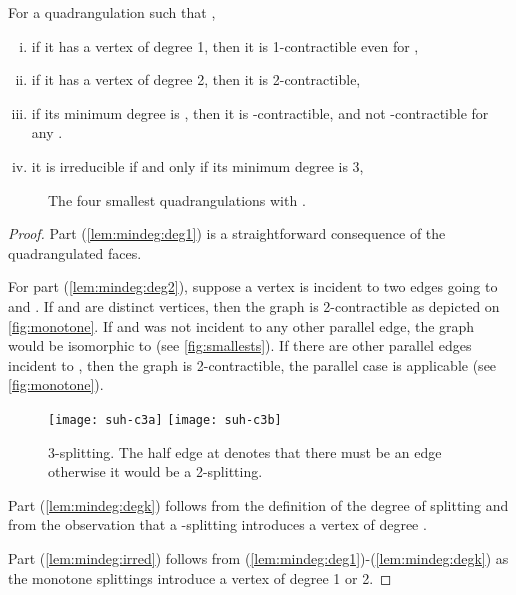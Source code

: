 \documentclass[]{article}
\begin{document}
\begin{prop}
\label{lem:mindeg}
For a quadrangulation such that ,
\begin{enumerate}[(i)]
\item 
  \label{lem:mindeg:deg1}
  if it has a vertex of degree 1, then it is 1-contractible even for ,
\item
  \label{lem:mindeg:deg2}
  if it has a vertex of degree 2, then it is 2-contractible,
\item
\label{lem:mindeg:degk}
  if its minimum degree is , then it is -contractible, and not -contractible for any .
\item
\label{lem:mindeg:irred}
  it is irreducible if and only if its minimum degree is 3,
\end{enumerate}
\end{prop}
\begin{figure}\centering
{}
\qquad
{}
\qquad
{}
\qquad
{}
\caption{The four smallest quadrangulations with .}
\label{fig:smallests}
\end{figure}
\begin{proof}
 Part (\ref*{lem:mindeg:deg1}) is a straightforward consequence of the quadrangulated faces.

For part (\ref*{lem:mindeg:deg2}), suppose a vertex  is incident to two edges going to  and .
If  and  are distinct vertices, then the graph is 2-contractible as depicted on \autoref{fig:monotone}.
If  and  was not incident to any other parallel edge, the graph would be isomorphic to  (see \autoref{fig:smallests}).
If there are other parallel edges incident to , then the graph is 2-contractible, the parallel case is applicable (see \autoref{fig:monotone}).

\begin{figure}\centering
  \texttt{[image: suh-c3a]}
\qquad
  \texttt{[image: suh-c3b]}
  \caption{3-splitting. The half edge at  denotes that there must be an edge otherwise it would be a 2-splitting.}
  \label{fig:3splitting}
\end{figure}

Part (\ref*{lem:mindeg:degk}) follows from the definition of the degree of splitting and from the observation that a -splitting introduces a vertex of degree .

Part (\ref*{lem:mindeg:irred}) follows from (\ref*{lem:mindeg:deg1})-(\ref*{lem:mindeg:degk}) as the monotone splittings introduce a vertex of degree 1 or 2.
\end{proof}
\end{document}
